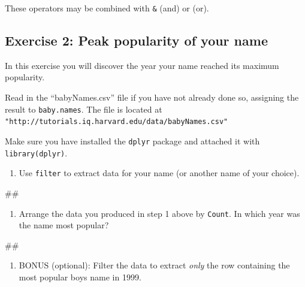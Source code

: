 \documentclass[]{book}
\newenvironment{Shaded}{\begin{snugshade}}{\end{snugshade}}
\newcommand{\NormalTok}[1]{#1}
\providecommand{\tightlist}{%
  \setlength{\itemsep}{0pt}\setlength{\parskip}{0pt}}
\begin{document}
These operators may be combined with \texttt{\&} (and) or
\texttt{\textbar{}} (or).

\subsection{Exercise 2: Peak popularity of your
name}\label{exercise-2-peak-popularity-of-your-name}

In this exercise you will discover the year your name reached its
maximum popularity.

Read in the ``babyNames.csv'' file if you have not already done so,
assigning the result to \texttt{baby.names}. The file is located at
\texttt{"http://tutorials.iq.harvard.edu/data/babyNames.csv"}

Make sure you have installed the \texttt{dplyr} package and attached it
with \texttt{library(dplyr)}.

\begin{enumerate}
\def\labelenumi{\arabic{enumi}.}
\tightlist
\item
  Use \texttt{filter} to extract data for your name (or another name of
  your choice).
\end{enumerate}

\begin{Shaded}
\begin{Highlighting}[]
\NormalTok{##}
\end{Highlighting}
\end{Shaded}

\begin{enumerate}
\def\labelenumi{\arabic{enumi}.}
\setcounter{enumi}{1}
\tightlist
\item
  Arrange the data you produced in step 1 above by \texttt{Count}. In
  which year was the name most popular?
\end{enumerate}

\begin{Shaded}
\begin{Highlighting}[]
\NormalTok{##}
\end{Highlighting}
\end{Shaded}

\begin{enumerate}
\def\labelenumi{\arabic{enumi}.}
\setcounter{enumi}{2}
\tightlist
\item
  BONUS (optional): Filter the data to extract \emph{only} the row
  containing the most popular boys name in 1999.
\end{enumerate}
\end{document}
